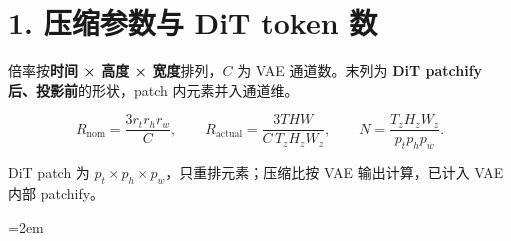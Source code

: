 \documentclass[
  11pt,
  a4paper,
  fontset=none]{ctexart}
\author{}
\date{}
\newcommand{\NotesTableStyle}{\linespread{1}\fontsize{9.5pt}{13pt}\selectfont\setlength{\tabcolsep}{4pt}\renewcommand{\arraystretch}{1.1}\setlength{\extrarowheight}{5pt}\setlength{\LTpre}{5pt}\setlength{\LTpost}{6pt}\setlength{\parskip}{0pt}\emergencystretch=2em}
\begin{document}
\vspace{1mm}{\color{notesblue}\rule{\linewidth}{0.8pt}}\vspace{1mm}

\section{1. 压缩参数与 DiT token
数}\label{ux538bux7f29ux53c2ux6570ux4e0e-dit-token-ux6570}

倍率按\textbf{时间 × 高度 × 宽度}排列，\(C\) 为 VAE 通道数。末列为
\textbf{DiT patchify 后、投影前}的形状，patch 内元素并入通道维。

\[
R_{\mathrm{nom}}=\frac{3r_t r_h r_w}{C},\qquad
R_{\mathrm{actual}}=\frac{3THW}{C\,T_zH_zW_z},\qquad
N=\frac{T_zH_zW_z}{p_tp_hp_w}.
\]

DiT patch 为 \(p_t\times p_h\times p_w\)，只重排元素；压缩比按 VAE
输出计算，已计入 VAE 内部 patchify。

\begingroup\NotesTableStyle\fontsize{9.5pt}{12pt}\selectfont\renewcommand{\arraystretch}{1.0}\setlength{\extrarowheight}{1pt}
\end{document}
